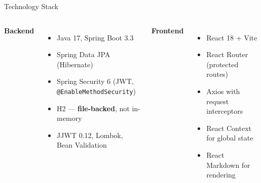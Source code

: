 \documentclass[aspectratio=169, 10pt]{beamer}
\begin{document}
\begin{frame}{Technology Stack}
  \begin{columns}[T,onlytextwidth]
      \textbf{Backend}
      \begin{itemize}\setlength\itemsep{4pt}
        \item Java 17, Spring Boot 3.3
        \item Spring Data JPA (Hibernate)
        \item Spring Security 6 (JWT, \texttt{@EnableMethodSecurity})
        \item H2 --- \textbf{file-backed}, not in-memory
        \item JJWT 0.12, Lombok, Bean Validation
      \end{itemize}
      \textbf{Frontend}
      \begin{itemize}\setlength\itemsep{4pt}
        \item React 18 + Vite
        \item React Router (protected routes)
        \item Axios with request interceptors
        \item React Context for global state
        \item React Markdown for rendering
      \end{itemize}
  \end{columns}
  \vspace{0.5cm}
  \begin{center}
  \end{center}
\end{frame}
\end{document}
